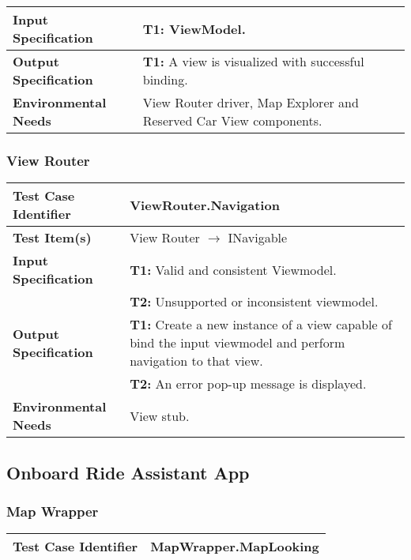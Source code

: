 {\begin{tabularx}{\textwidth}{l X}
    \textbf{Input Specification} & \textbf{T1:} ViewModel.\\
    \hline 
    
    \textbf{Output Specification} & \textbf{T1:} A view is visualized with successful binding.\\
    \hline 
    
    \textbf{Environmental Needs} & View Router driver, Map Explorer and Reserved Car View components.\\
    \hline
\end{tabularx}

\subsubsection{View Router}
\noindent
\begin{tabularx}{\textwidth}{l X}
    \hline 
    \textbf{Test Case Identifier} & ViewRouter.Navigation\\ 
    \hline 
    
    \textbf{Test Item(s)} & View Router $\rightarrow$ INavigable\\
    \hline 
    
    \textbf{Input Specification} & \textbf{T1:} Valid and consistent Viewmodel.\\
                                & \textbf{T2:} Unsupported or inconsistent viewmodel.\\
    \hline 
    
    \textbf{Output Specification} & \textbf{T1:} Create a new instance of a view capable of bind the input viewmodel and perform navigation to that view.\\
                                & \textbf{T2:} An error pop-up message is displayed.\\
    \hline 
    
    \textbf{Environmental Needs} & View stub.\\
    \hline
\end{tabularx}


\subsection{Onboard Ride Assistant App}

\subsubsection{Map Wrapper}
\noindent
\begin{tabularx}{\textwidth}{l X}
    \hline 
    \textbf{Test Case Identifier} & MapWrapper.MapLooking\\ 
    \hline 
    

\end{tabularx}}
